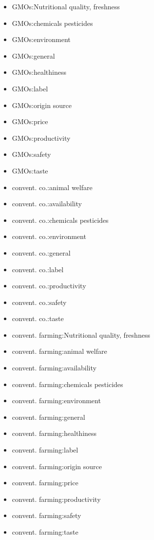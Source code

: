 \begin{multicols}{2}
	\begin{itemize}[leftmargin=*]
		\setlength\itemsep{-0.5em}

		\item[] GMOs:Nutritional quality, freshness 
		\item[] GMOs:chemicals pesticides 
		\item[] GMOs:environment
		\item[] GMOs:general
		\item[] GMOs:healthiness
		\item[] GMOs:label 
		\item[] GMOs:origin source 
		\item[] GMOs:price 
		\item[] GMOs:productivity 
		\item[] GMOs:safety
		\item[] GMOs:taste 
		\item[] convent. co.:animal welfare 
		\item[] convent. co.:availability
		\item[] convent. co.:chemicals pesticides
		\item[] convent. co.:environment 
		\item[] convent. co.:general 
		\item[] convent. co.:label
		\item[] convent. co.:productivity
		\item[] convent. co.:safety 
		\item[] convent. co.:taste
		\item[] convent. farming:Nutritional quality, freshness 
		\item[] convent. farming:animal welfare
		\item[] convent. farming:availability 
		\item[] convent. farming:chemicals pesticides 
		\item[] convent. farming:environment
		\item[] convent. farming:general
		\item[] convent. farming:healthiness
		\item[] convent. farming:label 
		\item[] convent. farming:origin source 
		\item[] convent. farming:price 
		\item[] convent. farming:productivity 
		\item[] convent. farming:safety
		\item[] convent. farming:taste 

\end{itemize}
\end{multicols}
